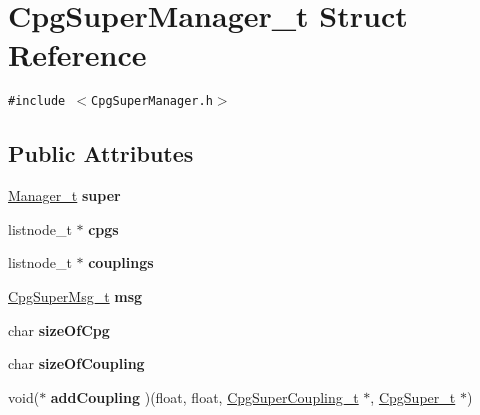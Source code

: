 \hypertarget{structCpgSuperManager__t}{
\section{CpgSuperManager\_\-t Struct Reference}
\label{structCpgSuperManager__t}
}
{\tt \#include $<$CpgSuperManager.h$>$}

\subsection*{Public Attributes}
\begin{CompactItemize}
\item 
\hypertarget{structCpgSuperManager__t_a98fa7329760d6a2697c7850dcb437b4}{
\hyperlink{structManager__t}{Manager\_\-t} \textbf{super}}
\label{structCpgSuperManager__t_a98fa7329760d6a2697c7850dcb437b4}

\item 
\hypertarget{structCpgSuperManager__t_2216074c95f55ab879f9d6fe509ddc42}{
listnode\_\-t $\ast$ \textbf{cpgs}}
\label{structCpgSuperManager__t_2216074c95f55ab879f9d6fe509ddc42}

\item 
\hypertarget{structCpgSuperManager__t_6e5ce8269e8d908968944155357c499b}{
listnode\_\-t $\ast$ \textbf{couplings}}
\label{structCpgSuperManager__t_6e5ce8269e8d908968944155357c499b}

\item 
\hypertarget{structCpgSuperManager__t_20c7bfd06eb26bfafdeb294f27226a97}{
\hyperlink{structCpgSuperMsg__t}{CpgSuperMsg\_\-t} \textbf{msg}}
\label{structCpgSuperManager__t_20c7bfd06eb26bfafdeb294f27226a97}

\item 
\hypertarget{structCpgSuperManager__t_691cc5a79c091303903639bc77b63d6f}{
char \textbf{sizeOfCpg}}
\label{structCpgSuperManager__t_691cc5a79c091303903639bc77b63d6f}

\item 
\hypertarget{structCpgSuperManager__t_ed6114241077343b358c38b640ff3c2d}{
char \textbf{sizeOfCoupling}}
\label{structCpgSuperManager__t_ed6114241077343b358c38b640ff3c2d}

\item 
\hypertarget{structCpgSuperManager__t_51239dffd0463de57f70e01f98fd6270}{
void($\ast$ \textbf{addCoupling} )(float, float, \hyperlink{structCpgSuperCoupling__t}{CpgSuperCoupling\_\-t} $\ast$, \hyperlink{structCpgSuper__t}{CpgSuper\_\-t} $\ast$)}
\label{structCpgSuperManager__t_51239dffd0463de57f70e01f98fd6270}


\end{CompactItemize}
